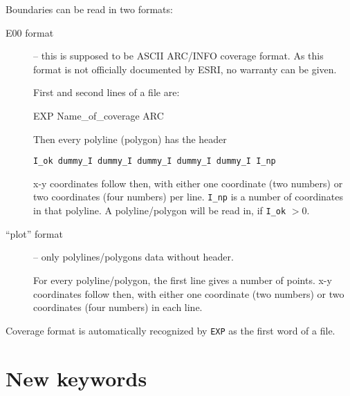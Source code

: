 Boundaries can be read in two formats:
\begin{description}
\item[E00 format] -- this is supposed to be ASCII ARC/INFO coverage
  format. As this format is not officially documented by ESRI, no
  warranty can be given.

  First and second lines of a file are:
\begin{verbatim*}
EXP    Name_of_coverage
ARC
\end{verbatim*}
  
  Then every polyline (polygon) has the header

\begin{verbatim}
I_ok dummy_I dummy_I dummy_I dummy_I dummy_I I_np
\end{verbatim}
  
  x-y coordinates follow then, with either one coordinate (two
  numbers) or two coordinates (four numbers) per line. \texttt{I\_np}
  is a number of coordinates in that polyline. A polyline/polygon will
  be read in, if \texttt{I\_ok} $>0$.

  
\item[``plot'' format] -- only polylines/polygons data without header.
  
  For every polyline/polygon, the first line gives a number of points.
  x-y coordinates follow then, with either one coordinate (two
  numbers) or two coordinates (four numbers) in each line.

\end{description}



Coverage format is automatically recognized by \texttt{EXP} as the
first word of a file.

\section{New keywords}
\label{sec:New-keywords}

